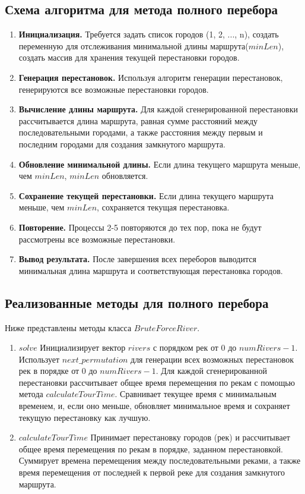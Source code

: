 \documentclass[12pt, a4paper]{article}
\begin{document}
\subsection{Схема алгоритма для метода полного перебора}
\begin{enumerate}
  \item \textbf{Инициализация.}
      Требуется задать список городов (1, 2, ..., n), создать 
      переменную для отслеживания минимальной длины 
      маршрута($minLen$), создать массив для хранения текущей 
      перестановки городов.
  \item \textbf{Генерация перестановок.}
      Используя алгоритм генерации перестановок, генерируются все 
      возможные перестановки городов.
  \item \textbf{Вычисление длины маршрута.}
      Для каждой сгенерированной перестановки рассчитывается длина 
      маршрута, равная сумме расстояний между последовательными 
      городами, а также расстояния между первым и последним городами 
      для создания замкнутого маршрута.
  \item \textbf{Обновление минимальной длины.}
      Если длина текущего маршрута меньше, чем $minLen$, $minLen$ 
      обновляется.
  \item \textbf{Сохранение текущей перестановки.}
	  Если длина текущего маршрута меньше, чем $minLen$, 
      сохраняется текущая перестановка.
  \item \textbf{Повторение.}
      Процессы 2-5 повторяются до тех пор, пока не будут рассмотрены 
      все возможные перестановки.
  \item \textbf{Вывод результата.}
      После завершения всех переборов выводится минимальная длина 
      маршрута и соответствующая перестановка городов.
\end{enumerate}
\subsection{Реализованные методы для полного перебора}
Ниже представлены методы класса $BruteForceRiver$.
\begin{enumerate}
	\item $solve$ Инициализирует вектор $rivers$ с порядком рек от 
	0 до $numRivers - 1$. Использует $next\_permutation$ для
	генерации всех возможных перестановок рек в порядке от 0 до 
	$numRivers - 1$. Для каждой сгенерированной перестановки 
	рассчитывает общее время перемещения по рекам с помощью метода 
	$calculateTourTime$.
	Сравнивает текущее время с минимальным временем, и, если оно 
	меньше, обновляет минимальное время и сохраняет текущую 
	перестановку как лучшую.
	\item $calculateTourTime$ Принимает перестановку городов (рек) и 
	рассчитывает общее время перемещения по рекам в порядке, 
	заданном перестановкой.
	Суммирует времена перемещения между последовательными реками, а 
	также время перемещения от последней к первой реке для создания 
	замкнутого маршрута.
\end{enumerate}
\end{document}
